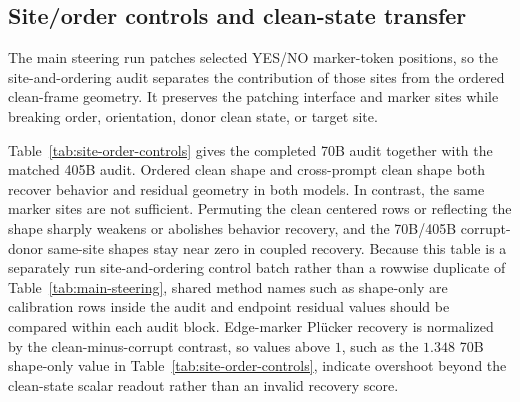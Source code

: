 \documentclass[11pt]{article}
\begin{document}
\subsection{Site/order controls and clean-state transfer}

The main steering run patches selected YES/NO marker-token positions, so the site-and-ordering audit separates the contribution of those sites from the ordered clean-frame geometry. It preserves the patching interface and marker sites while breaking order, orientation, donor clean state, or target site.

Table~\ref{tab:site-order-controls} gives the completed 70B audit together with the matched 405B audit. Ordered clean shape and cross-prompt clean shape both recover behavior and residual geometry in both models. In contrast, the same marker sites are not sufficient. Permuting the clean centered rows or reflecting the shape sharply weakens or abolishes behavior recovery, and the 70B/405B corrupt-donor same-site shapes stay near zero in coupled recovery. Because this table is a separately run site-and-ordering control batch rather than a rowwise duplicate of Table~\ref{tab:main-steering}, shared method names such as shape-only are calibration rows inside the audit and endpoint residual values should be compared within each audit block. Edge-marker Pl\"ucker recovery is normalized by the clean-minus-corrupt contrast, so values above $1$, such as the \(1.348\) 70B shape-only value in Table~\ref{tab:site-order-controls}, indicate overshoot beyond the clean-state scalar readout rather than an invalid recovery score.
\end{document}
